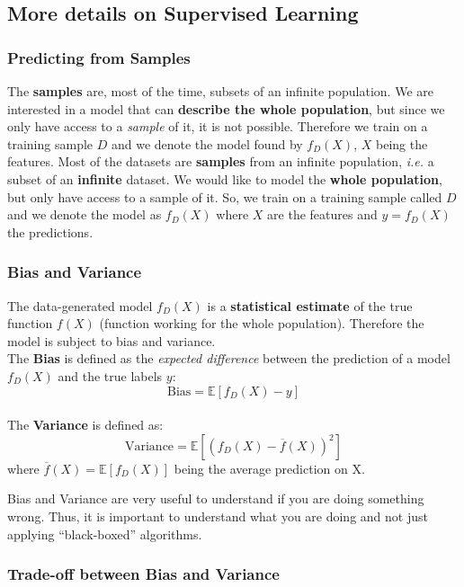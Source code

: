 \subsection{More details on Supervised Learning}

\subsubsection{Predicting from Samples}

The \textbf{samples} are, most of the time, subsets of an infinite population. We are interested in a model that can {\bf describe the whole population}, but since we only have access to a \emph{sample} of it, it is not possible. Therefore we train on a training sample $D$ and we denote the model found by $f_D(X)$, $X$ being the features.
Most of the datasets are \textbf{samples} from an infinite population, \emph{i.e.} a subset of an \textbf{infinite} dataset. We would like to model the \textbf{whole population}, but only have access to a sample of it. So, we train on a training sample called $D$ and we denote the model as $f_D(X)$ where $X$ are the features and $y=f_D(X)$ the predictions.

\subsubsection{Bias and Variance}

The data-generated model $f_D(X)$ is a \textbf{statistical estimate} of the true function $f(X)$ (function working for the whole population). Therefore the model is subject to bias and variance. 
\\
The \textbf{Bias} is defined as the \emph{expected difference} between the prediction of a model $f_D(X)$ and the true labels $y$:
\[
 \textrm{Bias} = \mathbb{E}\left[ f_D(X)-y\right]
\]
\\
The \textbf{Variance} is defined as:
\[
 \textrm{Variance} = \mathbb{E}\left[\left(f_D(X) - \overline{f}(X)\right)^2\right]
\]
where $\overline{f}(X) = \mathbb{E}\left[f_D(X)\right]$ being the average prediction on X.

Bias and Variance are very useful to understand if you are doing something wrong. Thus, it is important to understand what you are doing and not just applying ``black-boxed'' algorithms.

\subsubsection*{ Trade-off between Bias and Variance}

